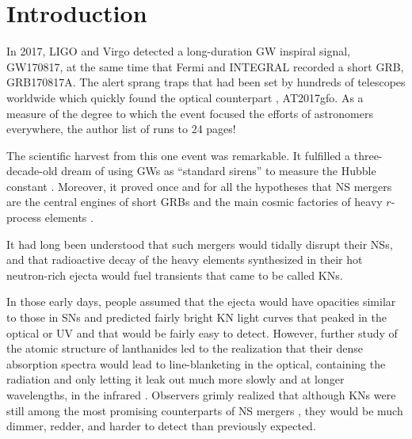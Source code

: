 \documentclass[twocolumn,times]{aastex631}
\begin{document}

\acresetall

\section{Introduction} \label{sec:intro}

In 2017, \ac{LIGO} and Virgo \citep{2017PhRvL.119p1101A} detected a long-duration \ac{GW} inspiral signal, GW170817, at the same time that Fermi \citep{2017ApJ...848L..14G} and INTEGRAL \citep{2017ApJ...848L..15S} recorded a short \ac{GRB}, GRB170817A. The alert sprang traps that had been set by hundreds of telescopes worldwide \citep{2014ApJS..211....7A,2016ApJ...826L..13A} which quickly found the optical counterpart \citep{2017Sci...358.1556C}, AT2017gfo. As a measure of the degree to which the event focused the efforts of astronomers everywhere, the author list of \citet{2017ApJ...848L..12A} runs to 24 pages!

The scientific harvest from this one event was remarkable. It fulfilled a three-decade-old dream of using \acp{GW} as ``standard sirens'' to measure the Hubble constant \citep{1986Natur.323..310S,2017Natur.551...85A}. Moreover, it proved once and for all the hypotheses that \ac{NS} mergers are the central engines of short \acp{GRB} \citep{2013ApJ...776...18F} and the main cosmic factories of heavy $r$-process elements \citep{1999ApJ...525L.121F}.

It had long been understood that such mergers would tidally disrupt their \acp{NS}, and that radioactive decay of the heavy elements synthesized in their hot neutron-rich ejecta would fuel transients \citep{1974ApJ...192L.145L,1989Natur.340..126E,1998ApJ...507L..59L} that came to be called \acp{KN}.

In those early days, people assumed that the ejecta would have opacities similar to those in \acp{SN} and predicted fairly bright \ac{KN} light curves that peaked in the optical or \ac{UV} and that would be fairly easy to detect. However, further study of the atomic structure of lanthanides led to the realization that their dense absorption spectra would lead to line-blanketing in the optical, containing the radiation and only letting it leak out much more slowly and at longer wavelengths, in the infrared \citep{2013ApJ...774...25K}. Observers grimly realized that although \acp{KN} were still among the most promising counterparts of \ac{NS} mergers \citep{2012ApJ...746...48M}, they would be much dimmer, redder, and harder to detect than previously expected.
\end{document}
